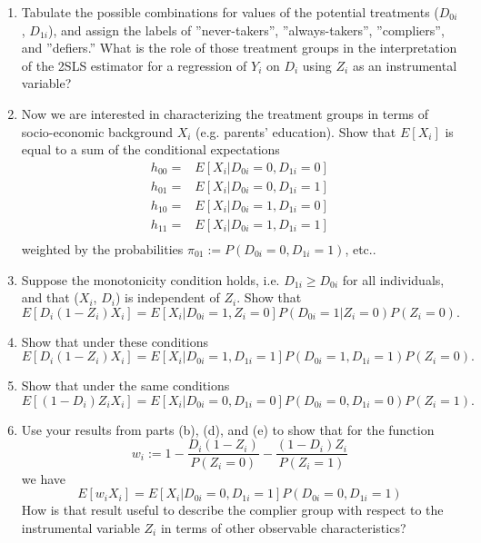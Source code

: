 \documentclass[11pt]{article}
\begin{document}
\bigskip
\begin{enumerate}[label=\alph*)]

    \item Tabulate the possible combinations for values of the potential treatments ($D_{0i}$, $D_{1i}$), and assign the labels of ”never-takers”, ”always-takers”, ”compliers”, and ”defiers.” What is the role of those treatment groups in the interpretation of the 2SLS estimator for a regression of $Y_i$ on $D_i$ using $Z_i$ as an instrumental variable?

    \item Now we are interested in characterizing the treatment groups in terms of socio-economic background $X_i$ (e.g. parents’ education). Show that $E[X_i]$ is equal to a sum of the conditional expectations 
    \[
    \begin{array}{cl}
    h_{00} =& E[X_i|D_{0i} = 0, D_{1i} = 0] \\
    h_{01} =& E[X_i|D_{0i} = 0, D_{1i} = 1] \\
    h_{10} =& E[X_i|D_{0i} = 1, D_{1i} = 0] \\
    h_{11} =& E[X_i|D_{0i} = 1, D_{1i} = 1] \\
    \end{array}
    \]
     weighted by the probabilities $\pi_{01} := P(D_{0i} = 0, D_{1i} = 1)$, etc..

    \item Suppose the monotonicity condition holds, i.e. $D_{1i} \geq D_{0i}$ for all individuals, and that ($X_i$, $D_i$) is independent of $Z_i$. Show that $$E[D_i(1 - Z_i)X_i] = E[X_i|D_{0i} = 1, Z_i = 0] P(D_{0i} = 1|Z_i = 0) P(Z_i = 0).$$ 

    \item Show that under these conditions $$E[D_i(1 - Z_i)X_i] = E[X_i|D_{0i} = 1, D_{1i} =1]P(D_{0i} = 1, D_{1i} = 1)P(Z_i = 0).$$

    \item Show that under the same conditions $$E[(1 - D_i)Z_i X_i] = E[X_i|D_{0i} = 0, D_{1i}= 0]P(D_{0i} = 0, D_{1i} = 0)P(Z_i = 1).$$

    \item Use your results from parts (b), (d), and (e) to show that for the function $$w_i := 1 - \frac{D_i(1 - Z_i)}{P (Z_i=0)} -  \frac{(1-D_i)Z_i }{P (Z_i=1)}$$ we have $$E[w_i X_i] = E[X_i|D_{0i} = 0, D_{1i} = 1]P(D_{0i} = 0, D_{1i} = 1)$$ How is that result useful to describe the complier group with respect to the instrumental variable $Z_i$ in terms of other observable characteristics?

\end{enumerate}
\end{document}
